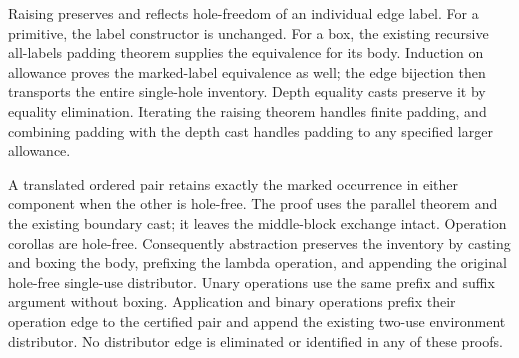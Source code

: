 Raising preserves and reflects hole-freedom of an individual edge label.
For a primitive, the label constructor is unchanged. For a box, the existing
recursive all-labels padding theorem supplies the equivalence for its body.
Induction on allowance proves the marked-label equivalence as well; the edge
bijection then transports the entire single-hole inventory. Depth equality
casts preserve it by equality elimination. Iterating the raising theorem
handles finite padding, and combining padding with the depth cast handles
padding to any specified larger allowance.











A translated ordered pair retains exactly the marked occurrence in either
component when the other is hole-free. The proof uses the parallel theorem
and the existing boundary cast; it leaves the middle-block exchange intact.
Operation corollas are hole-free. Consequently abstraction preserves the
inventory by casting and boxing the body, prefixing the lambda operation,
and appending the original hole-free single-use distributor. Unary operations
use the same prefix and suffix argument without boxing. Application and
binary operations prefix their operation edge to the certified pair and
append the existing two-use environment distributor. No distributor edge
is eliminated or identified in any of these proofs.













